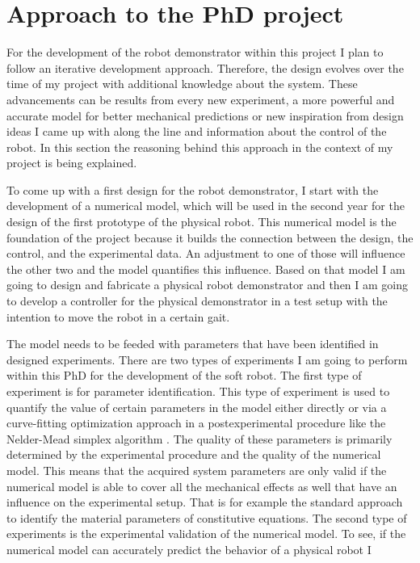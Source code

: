 \section{Approach to the PhD project} \label{sec:approach}
For the development of the robot demonstrator within this project I plan to follow an iterative development approach. Therefore, the design evolves over the time of my project
with additional knowledge about the system. These advancements can be results from every new experiment, a more powerful and accurate model for better mechanical predictions or new inspiration from design ideas
 I came up with along the line and information about the control of the robot. In this section the reasoning behind this approach in the context of my project is being explained.
%
\par
To come up with a first design for the robot demonstrator, I start with the development of a numerical model, which will be used in the second year for the design
 of the first prototype of the physical robot. This numerical model is the foundation of the project because it builds the connection
 between the design, the control, and the experimental data. An adjustment to one of those will influence the other two and the model quantifies this influence. 
%
Based on that model I am going to design and fabricate a physical robot demonstrator and then I am going to develop a controller for the physical demonstrator
 in a test setup with the intention to move the robot in a certain gait. 
%
\par
The model needs to be feeded with parameters that have been identified in designed experiments. 
%
There are two types of experiments I am going to perform within this PhD for the development of the soft robot. 
The first type of experiment is for parameter identification. This type of experiment is used to quantify the value of certain parameters in the model either directly 
or via a curve-fitting optimization approach in a postexperimental procedure like the Nelder-Mead simplex algorithm \cite{Gao2012}. The quality of these parameters is primarily determined by the experimental
 procedure and the quality of the numerical model.
This means that the acquired system parameters are only valid if the numerical model is able to cover all the mechanical effects as well that have an influence on the experimental setup. 
That is for example the standard approach to identify the material parameters of constitutive equations.
The second type of experiments is the experimental validation of the numerical model. To see, if the numerical model can accurately predict the behavior of a physical robot I 
